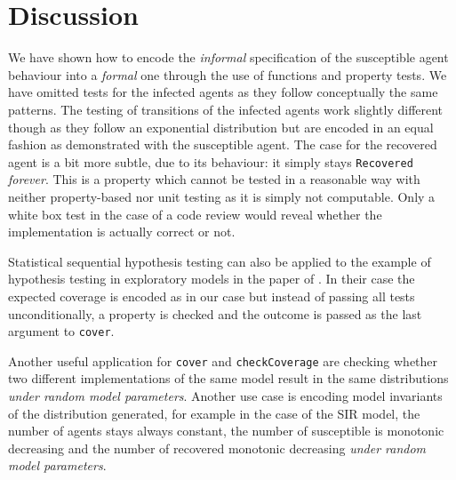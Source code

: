 \section{Discussion}
\label{sec:discussion}
We have shown how to encode the \textit{informal} specification of the susceptible agent behaviour into a \textit{formal} one through the use of functions and property tests. We have omitted tests for the infected agents as they follow conceptually the same patterns. The testing of transitions of the infected agents work slightly different though as they follow an exponential distribution but are encoded in an equal fashion as demonstrated with the susceptible agent. The case for the recovered agent is a bit more subtle, due to its behaviour: it simply stays \texttt{Recovered} \textit{forever}. This is a property which cannot be tested in a reasonable way with neither property-based nor unit testing as it is simply not computable. Only a white box test in the case of a code review would reveal whether the implementation is actually correct or not.
 
Statistical sequential hypothesis testing can also be applied to the example of hypothesis testing in exploratory models in the paper of \cite{thaler_show_2019}. In their case the expected coverage is encoded as in our case but instead of passing all tests unconditionally, a property is checked and the outcome is passed as the last argument to \texttt{cover}.

Another useful application for \texttt{cover} and \texttt{checkCoverage} are checking whether two different implementations of the same model result in the same distributions \textit{under random model parameters}. Another use case is encoding model invariants of the distribution generated, for example in the case of the SIR model, the number of agents stays always constant, the number of susceptible is monotonic decreasing and the number of recovered monotonic decreasing \textit{under random model parameters}.